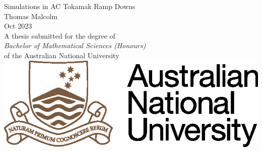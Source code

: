 \begin{titlepage}
\begin{center}

\vspace*{\fill} \Huge
                        Simulations in AC Tokamak Ramp Downs
\\
\vfill\vfill\Large
                          Thomas Malcolm
\\
\vfill\vfill
                          Oct 2023
\\
\vfill\vfill \normalsize
         A thesis submitted for the degree of \\
         \emph{Bachelor of Mathematical Sciences (Honours)} \\
         of the Australian National University
\vfill
         \includegraphics{ANU.eps}

\end{center}

\end{titlepage}
